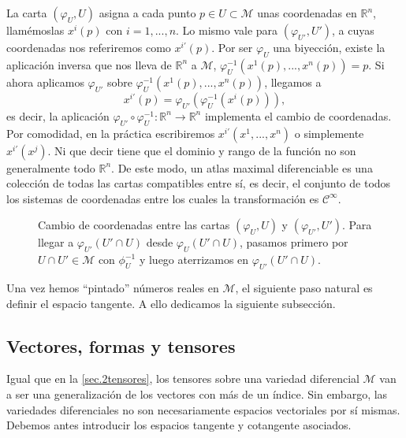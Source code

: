 La carta \((\varphi_U, U)\) asigna a cada punto \(p\in U \subset\mathcal{M}\) unas coordenadas en \(\mathbb{R}^n\), llamémoslas \(x^i(p)\) con \(i=1,...,n\). Lo mismo vale para \((\varphi_{U'}, U')\), a cuyas coordenadas nos referiremos como \(x^{i'}(p)\). Por ser \(\varphi_U\) una biyección, existe la aplicación inversa que nos lleva de \(\mathbb{R}^n\) a \(\mathcal{M}\), \(\varphi_U^{-1}(x^1(p),...,x^n(p)) = p\). Si ahora aplicamos \(\varphi_{U'}\) sobre \(\varphi_U^{-1}(x^1(p),...,x^n(p))\), llegamos a 
\begin{equation}
    x^{i'}(p) = \varphi_{U'}\left(\varphi_U^{-1}(x^i(p))\right),
\end{equation}
es decir, la aplicación \(\varphi_{U'}\circ \varphi_U^{-1}:\mathbb{R}^n\rightarrow \mathbb{R}^n\) implementa el cambio de coordenadas. Por comodidad, en la práctica escribiremos \(x^{i'}(x^1,...,x^n)\) o simplemente \(x^{i'}(x^j)\). Ni que decir tiene que el dominio y rango de la función no son generalmente todo \(\mathbb{R}^n\). De este modo, un atlas maximal diferenciable es una colección de todas las cartas compatibles entre sí, es decir, el conjunto de todos los sistemas de coordenadas entre los cuales la transformación es \(\mathcal{C}^\infty\).

\begin{figure}[htbp]
    \centering
    
    \caption{Cambio de coordenadas entre las cartas \((\varphi_U, U)\) y \((\varphi_{U'},U')\). Para llegar a \(\varphi_{U'}(U'\cap U)\) desde \(\varphi_{U}(U'\cap U)\), pasamos primero por \(U\cap U'\in\mathcal{M}\) con \(\phi^{-1}_U\) y luego aterrizamos en \(\varphi_{U'}(U'\cap U)\).}
    \label{fig.3-cambio_coordenadas}
\end{figure}

Una vez hemos ``pintado'' números reales en \(\mathcal{M}\), el siguiente paso natural es definir el espacio tangente. A ello dedicamos la siguiente subsección.

\subsection{Vectores, formas y tensores}
\label{subsec.3tensores}

Igual que en la \cref{sec.2tensores}, los tensores sobre una variedad diferencial \(\mathcal{M}\) van a ser una generalización de los vectores con más de un índice. Sin embargo, las variedades diferenciales no son necesariamente espacios vectoriales por sí mismas. Debemos antes introducir los espacios tangente y cotangente asociados.

